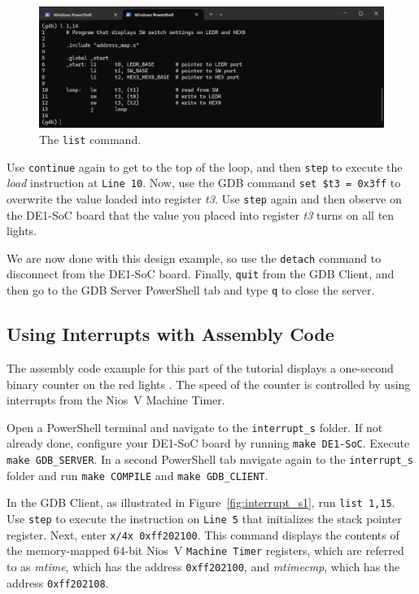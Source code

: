 \documentclass[11pt, twoside, pdftex]{article}
\newcommand{\red}[1]{{\color{red}\sf{#1}}}
\begin{document}
\begin{figure}[h]
    \begin{center}
        \includegraphics[scale=.6]{figures/display_s2.png}
        \caption{The \texttt{list} command.}
        \label{fig:display_s2}
    \end{center}
\end{figure}

Use \texttt{continue} again to get to the top of the loop, and then \texttt{step} to
execute the {\it load} instruction at \texttt{Line 10}. Now, use the GDB command 
\texttt{set \$t3 = 0x3ff} to overwrite the value loaded into register {\it t3}. Use
\texttt{step} again and then observe on the DE1-SoC board that the value you placed 
into register {\it t3} turns on all ten \red{{\it LEDR}} lights. 

We are now done with this design example, so use the \texttt{detach} command to disconnect
from the DE1-SoC board. Finally, \texttt{quit} from the GDB Client, and then go to the
GDB Server PowerShell tab and type \texttt{q} to close the server.

\subsection{Using Interrupts with Assembly Code}

The assembly code example for this part of the tutorial displays a one-second binary counter on 
the red lights \red{{\it LEDR}}. The speed of the counter is controlled by using interrupts from 
the Nios~V Machine Timer.  

Open a PowerShell terminal and navigate to the \texttt{interrupt\_s} folder.
If not already done, configure your DE1-SoC board by running \texttt{make DE1-SoC}. Execute 
\texttt{make GDB\_SERVER}. In a second PowerShell tab navigate again to the 
\texttt{interrupt\_s} folder and run \texttt{make COMPILE} and \texttt{make GDB\_CLIENT}.

In the GDB Client, as illustrated in Figure~\ref{fig:interrupt_s1}, run \texttt{list 1,15}. 
Use \texttt{step} to execute the instruction on \texttt{Line 5} that initializes the stack pointer
register. Next, enter \texttt{x/4x 0xff202100}. This command displays the contents 
of the memory-mapped 64-bit Nios~V \texttt{Machine Timer} registers, which are referred to as 
{\it mtime}, which has the address \texttt{0xff202100}, and {\it mtimecmp}, which has the
address \texttt{0xff202108}.
\end{document}
